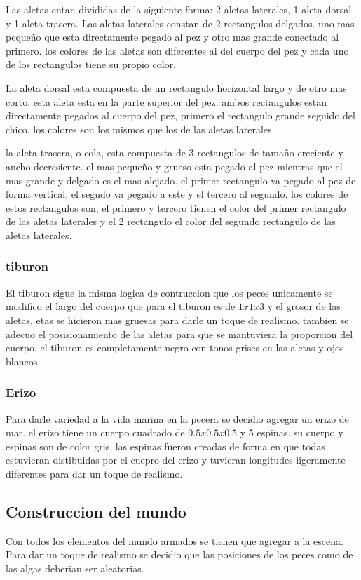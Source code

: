 \documentclass[10pt, a4paper, twocolumn]{article}
\begin{document}
Las aletas entan divididas de la siguiente forma: 2 aletas laterales, 1 aleta dorsal y 1 aleta trasera. Las aletas laterales constan de 2 rectangulos delgados. uno mas pequeño que esta directamente pegado al pez y otro mas grande conectado al primero. los colores de las aletas son diferentes al del cuerpo del pez y cada uno de los rectangulos tiene su propio color.

La aleta dorsal esta compuesta de un rectangulo horizontal largo y de otro mas corto. esta aleta esta en la parte superior del pez. ambos rectangulos estan directamente pegados al cuerpo del pez, primero el rectangulo grande seguido del chico. los colores son los mismos que los de las aletas laterales. 

la aleta trasera, o cola, esta compuesta de 3 rectangulos de tamaño creciente y ancho decresiente. el mas pequeño y grueso esta pegado al pez mientras que el mas grande y delgado es el mas alejado. el primer rectangulo va pegado al pez de forma vertical, el segudo va pegado a este y el tercero al segundo. los colores de estos rectangulos son, el primero y tercero tienen el color del primer rectangulo de las aletas laterales y el 2 rectangulo el color del segundo rectangulo de las aletas laterales.

\subsubsection{tiburon}
El tiburon sigue la misma logica de contruccion que los peces unicamente se modifico el largo del cuerpo que para el tiburon es de $1x1x3$ y el grosor de las aletas, etas se hicieron mas gruesas para darle un toque de realismo. tambien se adecuo el posisionamiento de las aletas para que se mantuviera la proporcion del cuerpo. el tiburon es completamente negro con tonos grises en las aletas y ojos blancos.

\subsubsection{Erizo}
Para darle variedad a la vida marina en la pecera se decidio agregar un erizo de mar. el erizo tiene un cuerpo cuadrado de $0.5x0.5x0.5$ y 5 espinas. su cuerpo y espinas son de color gris. las espinas fueron creadas de forma en que todas estuvieran distibuidas por el cuepro del erizo y tuvieran longitudes ligeramente diferentes para dar un toque de realismo.

\subsection{Construccion del mundo}
Con todos los elementos del mundo armados se tienen que agregar a la escena. Para dar un toque de realismo se decidio que las posiciones de los peces como de las algas deberian ser aleatorias. 
\end{document}
